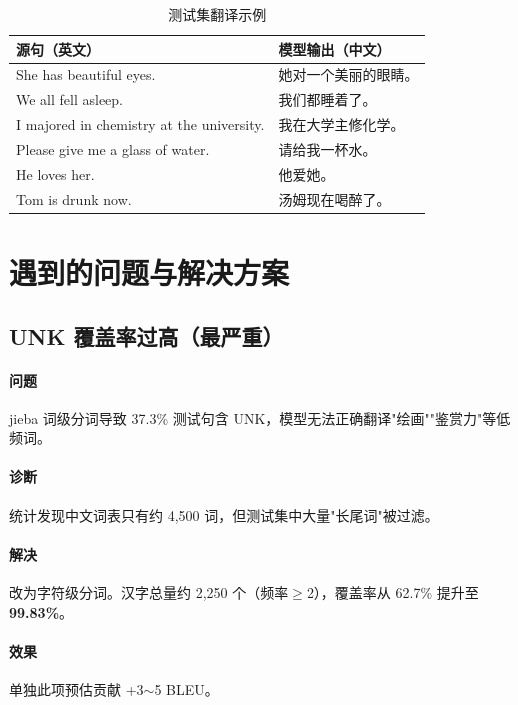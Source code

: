 \documentclass[12pt, a4paper]{ctexart}
\begin{document}
\begin{table}[H]
\centering
\caption{测试集翻译示例}
\begin{tabularx}{\textwidth}{XX}
\toprule
\textbf{源句（英文）} & \textbf{模型输出（中文）} \\
\midrule
She has beautiful eyes.                      & 她对一个美丽的眼睛。 \\
We all fell asleep.                          & 我们都睡着了。 \\
I majored in chemistry at the university.    & 我在大学主修化学。 \\
Please give me a glass of water.             & 请给我一杯水。 \\
He loves her.                                & 他爱她。 \\
Tom is drunk now.                            & 汤姆现在喝醉了。 \\
\bottomrule
\end{tabularx}
\end{table}

\section{遇到的问题与解决方案}

\subsection{UNK 覆盖率过高（最严重）}

\paragraph{问题} jieba 词级分词导致 37.3\% 测试句含 UNK，模型无法正确翻译"绘画""鉴赏力"等低频词。

\paragraph{诊断} 统计发现中文词表只有约 4,500 词，但测试集中大量"长尾词"被过滤。

\paragraph{解决} 改为字符级分词。汉字总量约 2,250 个（频率$\geq$2），覆盖率从 62.7\% 提升至 \textbf{99.83\%}。

\paragraph{效果} 单独此项预估贡献 +3$\sim$5 BLEU。
\end{document}
